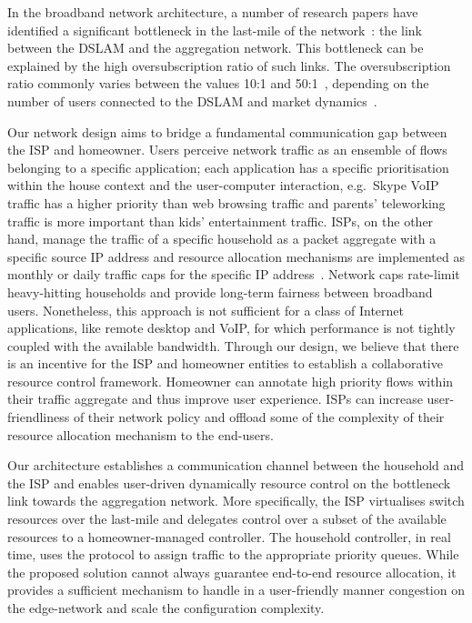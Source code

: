 In the broadband network architecture, a number of research papers have
identified a significant bottleneck in the last-mile of the
network~\cite{Dischinger:2007bg,Akella2003}: the link between the DSLAM and the
aggregation network. This bottleneck can be explained by the high
oversubscription ratio of such links. The oversubscription ratio commonly varies
between the values 10:1 and 50:1~\cite{canada-subscription}, depending on the
number of users connected to the DSLAM and market
dynamics~\cite{sky-oversubscription}.  

Our network design aims to bridge a fundamental communication gap between the
ISP and homeowner. Users perceive network traffic as an ensemble of flows
belonging to a specific application; each application has a specific
prioritisation within the house context and the user-computer interaction,
e.g.~Skype VoIP traffic has a higher priority than web browsing traffic and
parents' teleworking traffic is more important than kids' entertainment traffic.
ISPs, on the other hand, manage the traffic of a specific household as a packet
aggregate with a specific source IP address and resource allocation mechanisms
are implemented as monthly or daily traffic caps for the specific IP
address~\cite{virgin-caps,bt-caps}.  Network caps  rate-limit heavy-hitting
households and provide long-term fairness between broadband users. Nonetheless,
this approach is not sufficient for a class of Internet applications, like
remote desktop and VoIP, for which performance is not tightly coupled with the
available bandwidth. Through our design, we believe that there is an incentive
for the ISP and homeowner entities to establish a collaborative resource control
framework. Homeowner can annotate high priority flows within their traffic
aggregate and thus improve user experience. ISPs can increase user-friendliness
of their network policy and offload some of the complexity of their resource
allocation mechanism to the end-users. 

Our architecture establishes a communication channel between the household and
the ISP and enables user-driven dynamically resource control on the bottleneck
link towards the aggregation network. More specifically, the ISP virtualises
switch resources over the last-mile and delegates control over a subset of the
available resources to a homeowner-managed \of controller.  The household
controller, in real time, uses the \of protocol to assign traffic to the
appropriate priority queues.  While the proposed solution cannot always
guarantee end-to-end resource allocation, it provides a sufficient mechanism to
handle in a user-friendly manner congestion on the edge-network and scale the
configuration complexity. 


